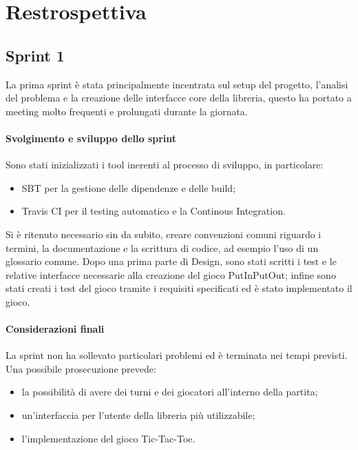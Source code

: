 \section{Restrospettiva}



\subsection{Sprint 1}
La prima sprint è stata principalmente incentrata sul setup del progetto, l'analisi del problema e la creazione delle interfacce core della libreria, questo ha portato a meeting molto frequenti e prolungati durante la giornata.
\paragraph{Svolgimento e sviluppo dello sprint}
Sono stati inizializzati i tool inerenti al processo di sviluppo, in particolare:
\begin{itemize}
   \item SBT per la gestione delle dipendenze e delle build;
   \item Travis CI per il testing automatico e la Continous Integration.
\end{itemize}
Si è ritenuto necessario sin da subito, creare convenzioni comuni riguardo i termini, la documentazione e la scrittura di codice, ad esempio l'uso di un glossario comune.
Dopo una prima parte di Design, sono stati scritti i test e le relative interfacce necessarie alla creazione del gioco PutInPutOut; infine sono stati creati i test del gioco tramite i requisiti specificati ed è stato implementato il gioco.
\paragraph{Considerazioni finali}
La sprint non ha sollevato particolari problemi ed è terminata nei tempi previsti.
Una possibile prosecuzione prevede:
\begin{itemize}
  \item la possibilità di avere dei turni e dei giocatori all'interno della partita;
  \item un'interfaccia per l'utente della libreria più utilizzabile;
  \item l'implementazione del gioco Tic-Tac-Toe.
\end{itemize} 